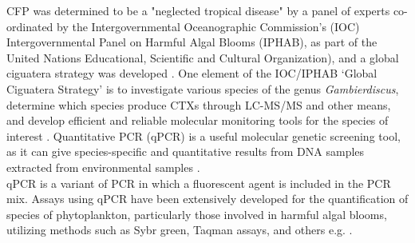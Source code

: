\documentclass[12pt]{article}
\begin{document}
CFP was determined  to be  a "neglected tropical disease" by a panel of experts co-ordinated by the Intergovernmental Oceanographic Commission’s (IOC) Intergovernmental Panel on Harmful Algal Blooms (IPHAB), as part of the United Nations Educational, Scientific and Cultural Organization), and a global ciguatera strategy was developed \cite{globalcig}. 
One element of the IOC/IPHAB ‘Global Ciguatera Strategy’ is to  investigate various species of the genus \emph{Gambierdiscus}, determine which species produce CTXs through LC-MS/MS and other means, and develop efficient and reliable molecular monitoring tools for the species of interest \citep{globalcig}. Quantitative PCR (qPCR) is a useful molecular genetic screening tool, as it can give species-specific and quantitative results from DNA samples extracted from environmental samples \citep{globalcig}. \\

qPCR is a variant of PCR in which a fluorescent agent is included in the PCR mix. Assays using qPCR have been extensively developed for the quantification of species of phytoplankton, particularly those involved in harmful algal blooms, utilizing methods such as Sybr green, Taqman assays, and others e.g. \citep{murray2011sxta,antonella2013quantitative,smith2009advantages,nishimura2016quantitative,vandersea2012development,hariganeya2013quantitative}. %
\end{document}
